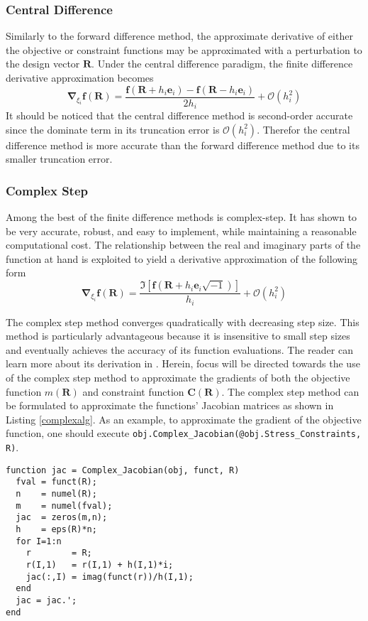 \documentclass{article}
\begin{document}
\subsubsection{Central Difference}
Similarly to the forward difference method, the approximate derivative of either the objective or constraint functions may be approximated with a perturbation to the design vector $\mathbf{R}$. Under the central difference paradigm, the finite difference derivative approximation becomes
$$ \mathbf{\nabla}_{\xi_i}\mathbf{f}(\mathbf{R}) =
\frac{\mathbf{f}(\mathbf{R} + h_i\mathbf{e}_i) - \mathbf{f}(\mathbf{R} - h_i\mathbf{e}_i)}{2h_i} + \mathcal{O}(h_i^2)$$
It should be noticed that the central difference method is second-order accurate since the dominate term in its truncation error is $\mathcal{O}(h_i^2)$. Therefor the central difference method is more accurate than the forward difference method due to its smaller truncation error.

\subsubsection{Complex Step}
Among the best of the finite difference methods is complex-step. It has shown to be very accurate, robust, and easy to implement, while maintaining a reasonable computational cost. The relationship between the real and imaginary parts of the function at hand is exploited to yield a derivative approximation of the following form
$$ \mathbf{\nabla}_{\xi_i}\mathbf{f}(\mathbf{R}) =
\frac{\Im [ \mathbf{f}(\mathbf{R} + h_i\mathbf{e}_i \sqrt{-1}) ] }{h_i} + \mathcal{O}(h_i^2)$$

The complex step method converges quadratically with decreasing step size. This method is particularly advantageous because it is insensitive to small step sizes and eventually achieves the accuracy of its function evaluations. The reader can learn more about its derivation in \cite{Lyness1968}. Herein, focus will be directed towards the use of the complex step method to approximate the gradients of both the objective function $m(\mathbf{R})$ and constraint function $\mathbf{C}(\mathbf{R})$. The complex step method can be formulated to approximate the functions' Jacobian matrices as shown in Listing \ref{complexalg}. As an example, to approximate the gradient of the objective function, one should execute \lstinline[breaklines=true]{obj.Complex_Jacobian(@obj.Stress_Constraints, R)}.

\begin{lstlisting}[caption=Complex Step Method, label=complexalg, float]
function jac = Complex_Jacobian(obj, funct, R)
  fval = funct(R);
  n    = numel(R);
  m    = numel(fval);
  jac  = zeros(m,n);
  h    = eps(R)*n;
  for I=1:n
    r        = R;
    r(I,1)   = r(I,1) + h(I,1)*i;
    jac(:,I) = imag(funct(r))/h(I,1);
  end
  jac = jac.';
end
\end{lstlisting}
\end{document}
